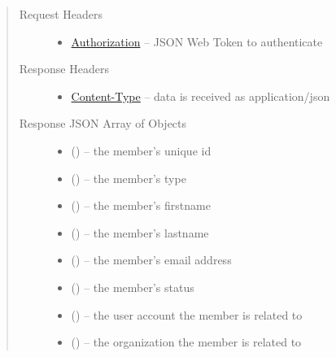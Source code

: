 \documentclass[letterpaper,10pt,english]{sphinxmanual}
\begin{document}
\begin{fulllineitems}
\begin{quote}
\begin{description}
\begin{itemize}
\end{itemize}

\item[{Request Headers}] \leavevmode\begin{itemize}
\item {} 
\href{http://tools.ietf.org/html/rfc7235\#section-4.2}{Authorization} -- JSON Web Token to authenticate

\end{itemize}

\item[{Response Headers}] \leavevmode\begin{itemize}
\item {} 
\href{http://tools.ietf.org/html/rfc7231\#section-3.1.1.5}{Content-Type} -- data is received as application/json

\end{itemize}

\item[{Response JSON Array of Objects}] \leavevmode\begin{itemize}
\item {} 
 () -- the member's unique id

\item {} 
 () -- the member's type

\item {} 
 () -- the member's firstname

\item {} 
 () -- the member's lastname

\item {} 
 () -- the member's email address

\item {} 
 () -- the member's status

\item {} 
 () -- the user account the member is related to

\item {} 
 () -- the organization the member is
related to


\end{itemize}
\end{description}
\end{quote}
\end{fulllineitems}
\end{document}
